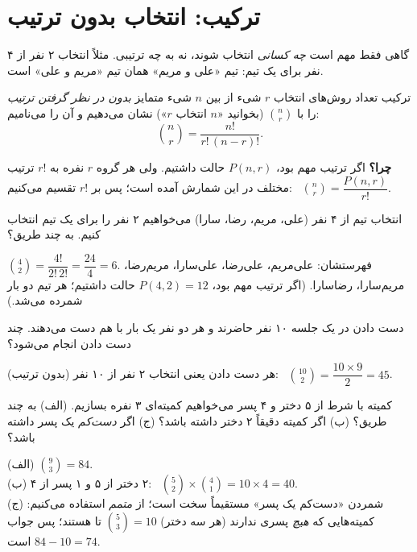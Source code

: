 \section{ترکیب: انتخاب بدون ترتیب}

گاهی فقط مهم است \emph{چه کسانی} انتخاب شوند، نه به چه ترتیبی. مثلاً انتخاب ۲ نفر از ۴ نفر برای یک تیم: تیم «علی و مریم» همان تیم «مریم و علی» است.

\begin{definition}[label=hs:def:comb]{ترکیب}
تعداد روش‌های انتخاب $r$ شیء از بین $n$ شیء متمایز \emph{بدون در نظر گرفتن ترتیب} را با $\binom nr$ (بخوانید «$n$ انتخاب $r$») نشان می‌دهیم و آن را  می‌نامیم:
\[ \binom nr=\frac{n!}{r!\,(n-r)!}. \]
\end{definition}

\textbf{چرا؟} اگر ترتیب مهم بود، $P(n,r)$ حالت داشتیم. ولی هر گروه $r$ نفره به $r!$ ترتیب مختلف در این شمارش آمده است؛ پس بر $r!$ تقسیم می‌کنیم: \ $\binom nr=\dfrac{P(n,r)}{r!}$.

\begin{example}[label=hs:ex:team]{انتخاب تیم}
از ۴ نفر (علی، مریم، رضا، سارا) می‌خواهیم ۲ نفر را برای یک تیم انتخاب کنیم. به چند طریق؟
\begin{solution}
$\binom42=\dfrac{4!}{2!\,2!}=\dfrac{24}{4}=6$. فهرستشان: علی‌مریم، علی‌رضا، علی‌سارا، مریم‌رضا، مریم‌سارا، رضاسارا. (اگر ترتیب مهم بود، $P(4,2)=12$ حالت داشتیم؛ هر تیم دو بار شمرده می‌شد.)
\end{solution}
\end{example}

\begin{example}[label=hs:ex:handshake]{دست دادن}
در یک جلسه ۱۰ نفر حاضرند و هر دو نفر یک بار با هم دست می‌دهند. چند دست دادن انجام می‌شود؟
\begin{solution}
هر دست دادن یعنی انتخاب ۲ نفر از ۱۰ نفر (بدون ترتیب): \ $\binom{10}2=\dfrac{10\times9}{2}=45$.
\end{solution}
\end{example}

\begin{example}[label=hs:ex:committee]{کمیته با شرط}
از ۵ دختر و ۴ پسر می‌خواهیم کمیته‌ای ۳ نفره بسازیم. (الف) به چند طریق؟ (ب) اگر کمیته دقیقاً ۲ دختر داشته باشد؟ (ج) اگر \emph{دست‌کم} یک پسر داشته باشد؟
\begin{solution}
(الف) $\binom93=84$.\\
(ب) ۲ دختر از ۵ و ۱ پسر از ۴: \ $\binom52\times\binom41=10\times4=40$.\\
(ج) شمردن «دست‌کم یک پسر» مستقیماً سخت است؛ از \emph{متمم} استفاده می‌کنیم: کمیته‌هایی که \emph{هیچ} پسری ندارند (هر سه دختر) $\binom53=10$ تا هستند؛ پس جواب $84-10=74$ است.
\end{solution}
\end{example}

